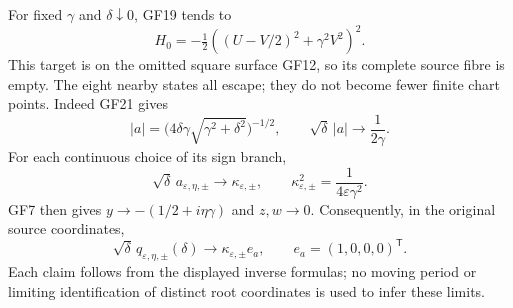 \documentclass[11pt]{article}
\begin{document}
For fixed $\gamma$ and $\delta\downarrow0$, GF19 tends to
\begin{equation}
 H_0=-\tfrac12\left((U-V/2)^2+\gamma^2V^2\right)^2.\tag{GF23}
\end{equation}
This target is on the omitted square surface GF12, so its complete
source fibre is empty. The eight nearby states all escape; they
do not become fewer finite chart points. Indeed GF21 gives
\[
 |a|=\bigl(4\delta\gamma\sqrt{\gamma^2+\delta^2}\bigr)^{-1/2},
 \qquad \sqrt\delta\,|a|\longrightarrow\frac1{2\gamma}.
\]
For each continuous choice of its sign branch,
\begin{equation}
 \sqrt\delta\,a_{\varepsilon,\eta,\pm}\longrightarrow
 \kappa_{\varepsilon,\pm},\qquad
 \kappa_{\varepsilon,\pm}^2=\frac1{4\varepsilon\gamma^2}.
 \tag{GF24}
\end{equation}
GF7 then gives
$y\to-(1/2+i\eta\gamma)$ and $z,w\to0$. Consequently, in
the original source coordinates,
\begin{equation}
 \sqrt\delta\,q_{\varepsilon,\eta,\pm}(\delta)
       \longrightarrow\kappa_{\varepsilon,\pm}e_a,
 \qquad e_a=(1,0,0,0)^{\mathsf T}.\tag{GF25}
\end{equation}
Each claim follows from the displayed inverse formulas; no moving
period or limiting identification of distinct root coordinates is
used to infer these limits.
\end{document}
